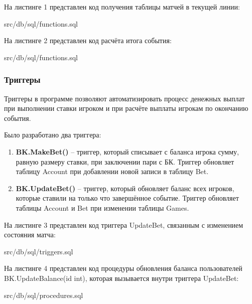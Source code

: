 \newpage
На листинге 1 представлен код получения таблицы матчей в текущей линии:
\FloatBarrier
\begin{lstinputlisting}[language=SQL, caption=Получение таблицы матчей в текущей линии, linerange = {78-101},
	basicstyle=\footnotesize\ttfamily, frame=single, breaklines=true]{src/db/sql/functions.sql}
\end{lstinputlisting}
\FloatBarrier

\newpage
На листинге 2 представлен код расчёта итога события:
\FloatBarrier
\begin{lstinputlisting}[language=SQL, caption=Расчёт итога события, linerange = {127-151},
	basicstyle=\footnotesize\ttfamily, frame=single,breaklines=true]{src/db/sql/functions.sql}
\end{lstinputlisting}
\FloatBarrier

\subsubsection{Триггеры}
Триггеры в программе позволяют автоматизировать процесс денежных выплат при выполнении ставки игроком и при расчёте выплаты игрокам по окончанию события.

Было разработано два триггера:
\begin{enumerate}
	\item \textbf{BK.MakeBet()} -- триггер, который списывает с баланса игрока сумму, равную размеру ставки, при заключении пари с БК. Триггер обновляет таблицу Account при добавлении новой записи в таблицу Bet.
	\item \textbf{BK.UpdateBet()} -- триггер, который обновляет баланс всех игроков, которые ставили на только что завершённое событие. Триггер обновляет таблицы Account и Bet при изменении таблицы Games.
\end{enumerate}

На листинге 3 представлен код триггера UpdateBet, связанным с изменением состояния матча:
\FloatBarrier
\begin{lstinputlisting}[language=SQL, caption=Триггер на обновление таблицы Games, linerange = {24-50},
	basicstyle=\footnotesize\ttfamily, frame=single,breaklines=true]{src/db/sql/triggers.sql}
\end{lstinputlisting}
\FloatBarrier

\newpage
На листинге 4 представлен код процедуры обновления баланса пользователей BK.UpdateBalance(id int), которая вызывается внутри триггера UpdateBet:
\FloatBarrier
\begin{lstinputlisting}[language=SQL, caption=Обновление балансов пользователй, linerange = {112-134},
	basicstyle=\footnotesize\ttfamily, frame=single,breaklines=true]{src/db/sql/procedures.sql}
\end{lstinputlisting}
\FloatBarrier

